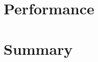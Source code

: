 \section{Performance}


\section{Summary}







\address{Dirk Eddelbuettel\\
  Debian Project\\
  Chicago, IL\\
  USA}\\

\address{Romain Fran\c{c}ois\\
  Professionnal R Enthusiast\\
  3 rue Emile Bonnet, 34 090 Montpellier\\
  FRANCE}\\

